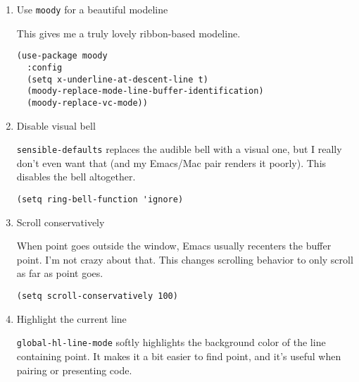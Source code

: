 \documentclass{article}
\begin{document}
\begin{enumerate}
\begin{verbatim}
(defun hrs/apply-theme ()
  "Apply the `solarized-dark' theme and make frames just slightly transparent."
  (interactive)
  (load-theme 'solarized-dark t))
\end{verbatim}

If this code is being evaluated by \texttt{emacs -{}-daemon}, ensure that each subsequent
frame is themed appropriately.

\begin{verbatim}
(if (daemonp)
	(add-hook 'after-make-frame-functions
			  (lambda (frame)
				(with-selected-frame frame (hrs/apply-theme))))
  (hrs/apply-theme))
\end{verbatim}

\item Use \texttt{moody} for a beautiful modeline
\label{sec:org10b6cd6}

This gives me a truly lovely ribbon-based modeline.

\begin{verbatim}
(use-package moody
  :config
  (setq x-underline-at-descent-line t)
  (moody-replace-mode-line-buffer-identification)
  (moody-replace-vc-mode))
\end{verbatim}


\item Disable visual bell
\label{sec:org2150f22}

\texttt{sensible-defaults} replaces the audible bell with a visual one, but I really
don't even want that (and my Emacs/Mac pair renders it poorly). This disables
the bell altogether.

\begin{verbatim}
(setq ring-bell-function 'ignore)
\end{verbatim}

\item Scroll conservatively
\label{sec:org1fa0b14}

When point goes outside the window, Emacs usually recenters the buffer point.
I'm not crazy about that. This changes scrolling behavior to only scroll as far
as point goes.

\begin{verbatim}
(setq scroll-conservatively 100)
\end{verbatim}



\item Highlight the current line
\label{sec:org9b29de6}

\texttt{global-hl-line-mode} softly highlights the background color of the line
containing point. It makes it a bit easier to find point, and it's useful when
pairing or presenting code.


\end{enumerate}
\end{document}
